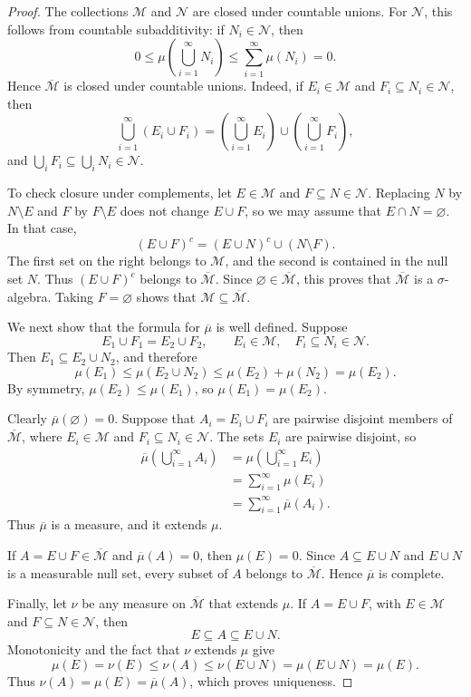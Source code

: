 \begin{proof}
  The collections $\mathcal M$ and $\mathcal N$ are closed under
  countable unions. For $\mathcal N$, this follows from countable
  subadditivity: if $N_i\in\mathcal N$, then
  \[
    0\leq\mu\left(\bigcup_{i=1}^{\infty}N_i\right)
    \leq\sum_{i=1}^{\infty}\mu(N_i)=0.
  \]
  Hence $\overline{\mathcal M}$ is closed under countable unions. Indeed,
  if $E_i\in\mathcal M$ and $F_i\subseteq N_i\in\mathcal N$, then
  \[
    \bigcup_{i=1}^{\infty}(E_i\cup F_i)
    =\left(\bigcup_{i=1}^{\infty}E_i\right)
      \cup\left(\bigcup_{i=1}^{\infty}F_i\right),
  \]
  and $\bigcup_iF_i\subseteq\bigcup_iN_i\in\mathcal N$.

  To check closure under complements, let $E\in\mathcal M$ and
  $F\subseteq N\in\mathcal N$. Replacing $N$ by $N\setminus E$ and
  $F$ by $F\setminus E$ does not change $E\cup F$, so we may assume that
  $E\cap N=\varnothing$. In that case,
  \[
    (E\cup F)^c=(E\cup N)^c\cup(N\setminus F).
  \]
  The first set on the right belongs to $\mathcal M$, and the second is
  contained in the null set $N$. Thus $(E\cup F)^c$ belongs to
  $\overline{\mathcal M}$. Since $\varnothing\in\overline{\mathcal M}$,
  this proves that $\overline{\mathcal M}$ is a $\sigma$-algebra. Taking
  $F=\varnothing$ shows that $\mathcal M\subseteq\overline{\mathcal M}$.

  We next show that the formula for $\overline\mu$ is well defined.
  Suppose
  \[
    E_1\cup F_1=E_2\cup F_2,
    \qquad
    E_i\in\mathcal M,
    \quad F_i\subseteq N_i\in\mathcal N.
  \]
  Then $E_1\subseteq E_2\cup N_2$, and therefore
  \[
    \mu(E_1)
    \leq\mu(E_2\cup N_2)
    \leq\mu(E_2)+\mu(N_2)
    =\mu(E_2).
  \]
  By symmetry, $\mu(E_2)\leq\mu(E_1)$, so
  $\mu(E_1)=\mu(E_2)$.

  Clearly $\overline\mu(\varnothing)=0$. Suppose that
  $A_i=E_i\cup F_i$ are pairwise disjoint members of
  $\overline{\mathcal M}$, where $E_i\in\mathcal M$ and
  $F_i\subseteq N_i\in\mathcal N$. The sets $E_i$ are pairwise disjoint,
  so
  \begin{align*}
    \overline\mu\left(\bigcup_{i=1}^{\infty}A_i\right)
    &=\mu\left(\bigcup_{i=1}^{\infty}E_i\right)\\
    &=\sum_{i=1}^{\infty}\mu(E_i)\\
    &=\sum_{i=1}^{\infty}\overline\mu(A_i).
  \end{align*}
  Thus $\overline\mu$ is a measure, and it extends $\mu$.

  If $A=E\cup F\in\overline{\mathcal M}$ and
  $\overline\mu(A)=0$, then $\mu(E)=0$. Since
  $A\subseteq E\cup N$ and $E\cup N$ is a measurable null set, every
  subset of $A$ belongs to $\overline{\mathcal M}$. Hence
  $\overline\mu$ is complete.

  Finally, let $\nu$ be any measure on $\overline{\mathcal M}$ that
  extends $\mu$. If $A=E\cup F$, with $E\in\mathcal M$ and
  $F\subseteq N\in\mathcal N$, then
  \[
    E\subseteq A\subseteq E\cup N.
  \]
  Monotonicity and the fact that $\nu$ extends $\mu$ give
  \[
    \mu(E)=\nu(E)\leq\nu(A)\leq\nu(E\cup N)
    =\mu(E\cup N)=\mu(E).
  \]
  Thus $\nu(A)=\mu(E)=\overline\mu(A)$, which proves uniqueness.
\end{proof}

